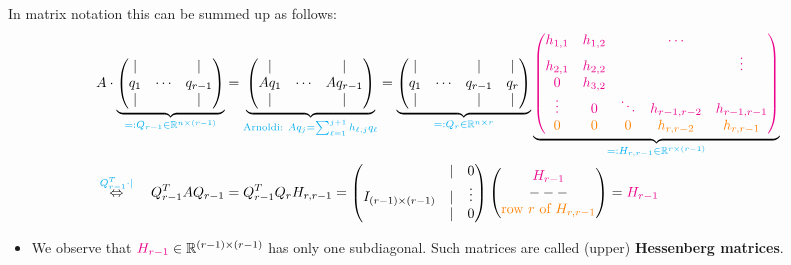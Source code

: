 \begin{frame}
In matrix notation this can be summed up as follows:
			\begin{align*}
			A\cdot\underbrace{\begin{pmatrix}
				|&~&|\\
				q_1&\cdots&q_{r-1}\\
				|&~&|
				\end{pmatrix}}_{{\color{cyan}=:Q_{r-1}\in{\mathbb{R}}^{n \times (r-1)}}}
			&=\underbrace{\begin{pmatrix}
				|&~&|\\
				Aq_1&\cdots&Aq_{r-1}\\
				|&~&|
				\end{pmatrix}}_{{\color{cyan}\text{\scriptsize Arnoldi:}~Aq_j=\sum_{\ell=1}^{j+1}h_{\ell,j}q_\ell}}
			=\underbrace{\begin{pmatrix}
				|&~&|&|\\
				q_1&\cdots&q_{r-1}&q_r\\
				|&~&|&|
				\end{pmatrix}}_{{\color{cyan}=:Q_r \in{\mathbb{R}}^{n \times r}}}
			\underbrace{\color{magenta}\begin{pmatrix}
				h_{1,1}&h_{1,2}&~&\cdots& \\
				h_{2,1}&h_{2,2}&~&~&\vdots\\
				0&h_{3,2}&~&~&~\\
				\vdots&0&\ddots&h_{r-1,r-2}&h_{r-1,r-1}\\
				{\color{orange}0}&{\color{orange}0}&{\color{orange}0}&{\color{orange}h_{r,r-2}}&{\color{orange}h_{r,r-1}}
				\end{pmatrix}}_{{\color{cyan}=:H_{r,r-1}\in{\mathbb{R}}^{r \times (r-1)}}}\\
			\stackrel{{\color{cyan}Q_{r-1}^T  \cdot|}}{\Leftrightarrow}
			~~~Q_{r-1}^TAQ_{r-1}
			&=Q_{r-1}^TQ_rH_{r,r-1}=
			\begin{pmatrix}
			~&|&0\\
			I_{(r-1)\times(r-1)}&|&\vdots\\
			~&|&0
			\end{pmatrix}
			\begin{pmatrix}
			{\color{magenta}H_{r-1}}\\---\\{\color{orange}\text{row}~r~\text{of}~H_{r,r-1}}
			\end{pmatrix} = {\color{magenta}H_{r-1}}
			\end{align*}
\begin{itemize}
	\item 			We observe that ${\color{magenta}H_{r-1}}\in\mathbb{R}^{(r-1)\times(r-1)}$ has only one subdiagonal. Such matrices are called (upper) \textbf{\color{defgruen}Hessenberg matrices}.\\~\\

\end{itemize}
\end{frame}
